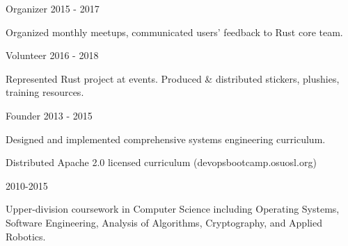 \documentclass[11pt]{article} %
\begin{document}

\begin{description}
\squish
{}
           {Organizer}
           {2015 - 2017}

Organized monthly meetups, communicated users' feedback to Rust core team.

           {Volunteer}
           {2016 - 2018}

Represented Rust project at events. Produced \& distributed stickers, plushies, training resources.

           {Founder}
           {2013 - 2015}

Designed and implemented comprehensive systems engineering curriculum.

Distributed Apache 2.0 licensed curriculum (devopsbootcamp.osuosl.org)

% 

\end{description}


\begin{description}
\squish
{}
           {}
           {2010-2015}

Upper-division coursework in Computer Science including Operating Systems,\\
Software Engineering, Analysis of Algorithms, Cryptography, and Applied Robotics.

\end{description}

%
%
%
%
%
\end{document}
